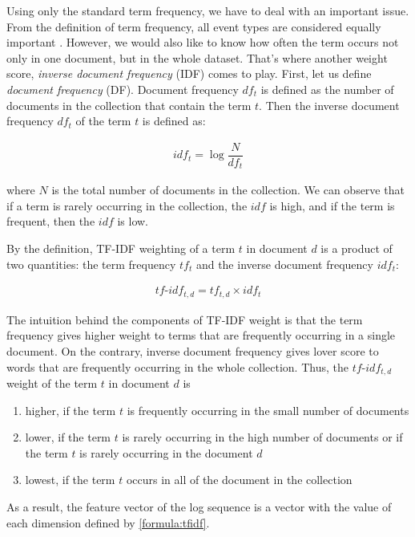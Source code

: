Using only the standard term frequency, we have to deal with an important issue. From the definition of term frequency, all event types are considered equally important \cite{informationRetrieval2008}. However, we would also like to know how often the term occurs not only in one document, but in the whole dataset. That's where another weight score, \textit{inverse document frequency} (IDF) comes to play. First, let us define \textit{document frequency} (DF). Document frequency $df_t$ is defined as the number of documents in the collection that contain the term $t$. Then the inverse document frequency $df_t$ of the term $t$ is defined as: 

\begin{gather}
    idf_t = \log{\dfrac{N}{df_t}}
    \label{formula:idf}
\end{gather}

where $N$ is the total number of documents in the collection. We can observe that if a term is rarely occurring in the collection, the $idf$ is high, and if the term is frequent, then the $idf$ is low.

By the definition, TF-IDF weighting of a term $t$ in document $d$ is a product of two quantities: the term frequency $tf_t$ and the inverse document frequency $idf_t$:

\begin{gather}
    tf\text{-}idf_{t, d} = tf_{t,d} \times idf_t
    \label{formula:tfidf}
\end{gather}

The intuition behind the components of TF-IDF weight is that the term frequency gives higher weight to terms that are frequently occurring in a single document. On the contrary, inverse document frequency gives lover score to words that are frequently occurring in the whole collection. Thus, the $tf\text{-}idf_{t, d}$ weight of the term $t$ in document $d$ is 

\begin{enumerate}
    \item higher, if the term $t$ is frequently occurring in the small number of documents
    \item lower, if the term $t$ is rarely occurring in the high number of documents or if the term $t$ is rarely occurring in the document $d$
    \item lowest, if the term $t$ occurs in all of the document in the collection
\end{enumerate}

As a result, the feature vector of the log sequence is a vector with the value of each dimension defined by \ref{formula:tfidf}.

